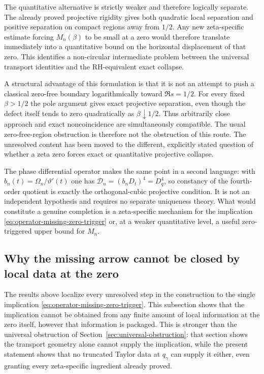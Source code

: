 \documentclass[11pt]{amsart}
\numberwithin{equation}{section}
\begin{document}
The quantitative alternative is strictly weaker and therefore logically
separate.  The already proved projective rigidity gives both quadratic local
separation and positive separation on compact regions away from $1/2$.  Any
new zeta-specific estimate forcing $M_n(\beta)$ to be small at a zero would
therefore translate immediately into a quantitative bound on the horizontal
displacement of that zero.  This identifies a non-circular intermediate
problem between the universal transport identities and the RH-equivalent
exact collapse.

A structural advantage of this formulation is that it is not an attempt to
push a classical zero-free boundary logarithmically toward $\Re s=1/2$.
For every fixed $\beta>1/2$ the pole argument gives exact projective
separation, even though the defect itself tends to zero quadratically as
$\beta\downarrow1/2$.  Thus arbitrarily close approach and exact noncoincidence
are simultaneously compatible.  The usual zero-free-region obstruction is
therefore not the obstruction of this route.  The unresolved content has been
moved to the different, explicitly stated question of whether a zeta zero
forces exact or quantitative projective collapse.

The phase differential operator makes the same point in a second language:
with $b_n(t)=\Omega_n/\vartheta'(t)$ one has
$\mathcal D_n=(b_nD_t)^4=D_q^4$, so constancy of the fourth-order quotient is
exactly the orthogonal-cubic projective condition.  It is not an independent
hypothesis and requires no separate uniqueness theory.  What would constitute
a genuine completion is a zeta-specific mechanism for the implication
\eqref{eq:operator-missing-zero-trigger} or, at a weaker quantitative level,
a useful zero-triggered upper bound for $M_n$.

\subsection{Why the missing arrow cannot be closed by local data at the zero}
\label{subsec:no-finite-jet}

The results above localize every unresolved step in the construction to the
single implication \eqref{eq:operator-missing-zero-trigger}.  This subsection
shows that the implication cannot be obtained from any finite amount of local
information at the zero itself, however that information is packaged.  This
is stronger than the universal obstruction of
Section~\ref{sec:universal-obstruction}: that section shows the transport
geometry alone cannot supply the implication, while the present statement
shows that no truncated Taylor data at $q_\gamma$ can supply it either, even
granting every zeta-specific ingredient already proved.
\end{document}
